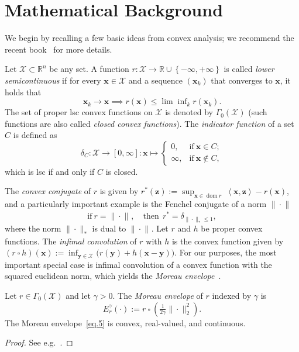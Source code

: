 \documentclass[twoside,11pt]{article}
\newcommand{\vx}{\bm{x}}       \newcommand{\vxh}{\hat{\bm{x}}}        \newcommand{\xh}{\hat{x}}    \newcommand{\vxt}{\tilde{\bm{x}}}       \newcommand{\xt}{\tilde{x}}
\newcommand{\vy}{\bm{y}}       \newcommand{\vyh}{\hat{\bm{y}}}        \newcommand{\yh}{\hat{y}}    \newcommand{\vyt}{\tilde{\bm{y}}}       \newcommand{\yt}{\tilde{y}}
\newcommand{\vz}{\bm{z}}       \newcommand{\vzh}{\hat{\bm{z}}}        \newcommand{\zh}{\hat{z}}    \newcommand{\vzt}{\tilde{\bm{z}}}       \newcommand{\zt}{\tilde{z}}
\newcommand{\Xc}{\mathcal{X}}
\newcommand{\mynorm}[2]{\| {#1} \|_{#2}}
\newcommand{\norm}[2]{\mynorm{#1}{#2}}
\newcommand{\enorm}[1]{\mynorm{#1}{2}}
\DeclareMathOperator{\dom}{dom}
\newcommand{\infconv}{\:\square\:}
\newcommand{\set}[1]{\left\{ {#1}\right\}}
\newcommand{\ip}[2]{\left\langle#1, #2\right\rangle}
\newcommand{\reals}{\mathbb{R}}
\newcommand{\ind}{\delta}
\numberwithin{equation}{section}
\numberwithin{theorem}{section}
\begin{document}
\appendix

\section{Mathematical Background}
\label{app:mathbackground}
We begin by recalling a few basic ideas from convex analysis; we recommend the recent book~\citep{bauCom} for more details.

Let $\Xc \subset \reals^n$ be any set. A function $r : \Xc \to \reals \cup \set{-\infty,+\infty}$ is called \emph{lower semicontinuous} if for every $\vx \in \Xc$ and a sequence $(\vx_k)$ that converges to $\vx$, it holds that
\begin{equation}
\label{eq.19}
  \vx_k \to \vx \implies r(\vx) \le \lim\inf\nolimits_k r(\vx_k).
\end{equation}
The set of proper lsc convex functions on $\Xc$ is denoted by $\Gamma_0(\Xc)$ (such functions are also called \emph{closed convex functions}). The \emph{indicator function} of a set $C$ is  defined as
\begin{equation}
  \label{eq.3}
  \ind_{C} : \Xc \to [0,\infty] : \vx \mapsto
  \begin{cases}
    0,& \text{if}\ \vx \in C;\\
    \infty,& \text{if}\ \vx\not\in C,
  \end{cases}
\end{equation}
which is lsc if and only if $C$ is closed.

The \emph{convex conjugate} of $r$ is given by $r^*(\vz):=\sup_{\vx \in \dom r}\ \ip{\vx}{\vz} - r(\vx)$, and a particularly important example is the Fenchel conjugate of a norm $\norm{\cdot}{}$
\begin{equation}
  \label{eq:7}
  \text{if}\ r=\norm{\cdot}{},\quad\text{then}\ \ r^* = \ind_{\norm{\cdot}{*} \le 1},
\end{equation}
where the norm $\norm{\cdot}{*}$ is dual to $\norm{\cdot}{}$. Let $r$ and $h$ be proper convex functions. The \emph{infimal convolution} of $r$ with $h$ is the convex function given by $(r\infconv h)(\vx) := \inf_{\vy \in \Xc}\bigl(r(\vy)+ h(\vx-\vy))$.
For our purposes, the most important special case is infimal convolution of a convex function with the squared euclidean norm, which yields the \emph{Moreau envelope}~\citep{moreau62}.
\begin{proposition}
  Let $r \in \Gamma_0(\Xc)$ and let $\gamma > 0$. The \emph{Moreau envelope} of $r$ indexed by $\gamma$ is
  \begin{equation}
    \label{eq.5}
    E_r^\gamma(\cdot):= r\infconv (\tfrac{1}{2\gamma}\enorm{\cdot}^2).
  \end{equation}
  The Moreau envelope~\eqref{eq.5} is convex, real-valued, and continuous.
\end{proposition}
\begin{proof}
  See e.g.~\citep[Prop.~12.15]{bauCom}.
\end{proof}
\end{document}
